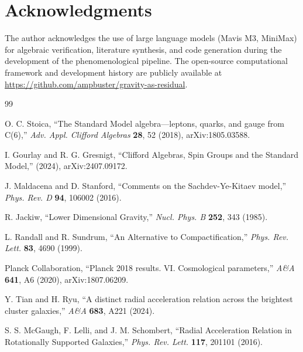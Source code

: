 \documentclass[12pt, a4paper]{article}
\begin{document}
\section*{Acknowledgments}
The author acknowledges the use of large language models (Mavis M3, MiniMax) for algebraic verification, literature synthesis, and code generation during the development of the phenomenological pipeline. The open-source computational framework and development history are publicly available at \url{https://github.com/ampbuster/gravity-as-residual}.

\begin{thebibliography}{99}

O. C. Stoica, ``The Standard Model algebra---leptons, quarks, and gauge from C(6),'' \textit{Adv. Appl. Clifford Algebras} \textbf{28}, 52 (2018), arXiv:1805.03588.

I. Gourlay and R. G. Gresnigt, ``Clifford Algebras, Spin Groups and the Standard Model,'' (2024), arXiv:2407.09172.

J. Maldacena and D. Stanford, ``Comments on the Sachdev-Ye-Kitaev model,'' \textit{Phys. Rev. D} \textbf{94}, 106002 (2016).

R. Jackiw, ``Lower Dimensional Gravity,'' \textit{Nucl. Phys. B} \textbf{252}, 343 (1985).

L. Randall and R. Sundrum, ``An Alternative to Compactification,'' \textit{Phys. Rev. Lett.} \textbf{83}, 4690 (1999).

Planck Collaboration, ``Planck 2018 results. VI. Cosmological parameters,'' \textit{A\&A} \textbf{641}, A6 (2020), arXiv:1807.06209.

Y. Tian and H. Ryu, ``A distinct radial acceleration relation across the brightest cluster galaxies,'' \textit{A\&A} \textbf{683}, A221 (2024).

S. S. McGaugh, F. Lelli, and J. M. Schombert, ``Radial Acceleration Relation in Rotationally Supported Galaxies,'' \textit{Phys. Rev. Lett.} \textbf{117}, 201101 (2016).

\end{thebibliography}
\end{document}
